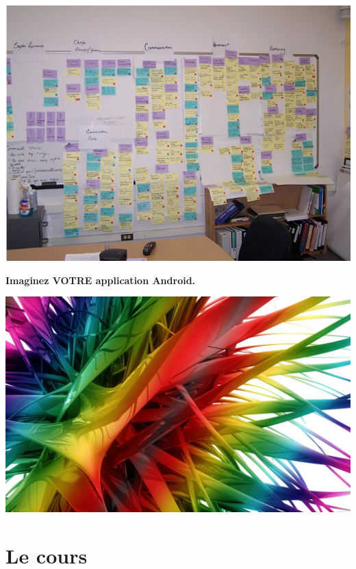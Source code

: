 \documentclass{beamer}
\begin{document}
\begin{frame}
\begin{center}
\includegraphics[scale=0.35]{afinity_diag.jpg}
\end{center}
\end{frame}

\begin{frame}
\begin{center}
\textbf{Imaginez VOTRE application Android.}
\end{center}

\begin{center}
\includegraphics[scale=0.2]{couleurs.jpg}

\end{center}
\end{frame}

\section{Le cours}
\end{document}
